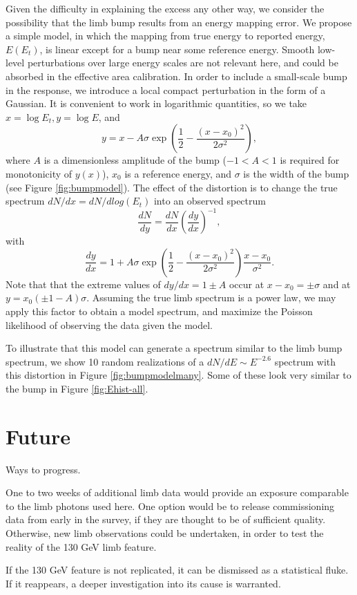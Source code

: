 \documentclass[aps,twocolumn,prd,superscriptaddress,showpacs,nofootinbib,fixfloat]{revtex4}
\newcommand{\be}{\begin{equation}}
\newcommand{\ee}{\end{equation}}
\begin{document}
Given the difficulty in explaining the excess any other way, we consider the
possibility that the limb bump results from an energy mapping error.  We
propose a simple model, in which the mapping from true energy to reported
energy, $E(E_t)$, is linear except for a bump near some reference energy.
Smooth low-level perturbations over large energy scales are not relevant here,
and could be absorbed in the effective area calibration.  In order to include
a small-scale bump in the response, we introduce a local compact perturbation
in the form of a Gaussian.  It is convenient to work in logarithmic
quantities, so we take $x=\log E_t, y=\log E$, and
\be
\label{eq:yofx}
y=x - A\sigma \exp\left(\frac{1}{2}-\frac{(x-x_0)^2}{2\sigma^2}\right),
\ee
where $A$ is a dimensionless amplitude of the bump ($-1<A<1$ is required
for monotonicity of $y(x)$), $x_0$ is a reference energy, and $\sigma$ is the
width of the bump (see Figure \ref{fig:bumpmodel}).
The effect of the distortion is to change the true spectrum $dN/dx =
dN/dlog(E_t)$ into an observed spectrum
\be
\label{eq:dndy}
\frac{dN}{dy} = \frac{dN}{dx} \left(\frac{dy}{dx}\right)^{-1} ,
\ee
with
\be
\label{eq:dydx}
\frac{dy}{dx} = 1 + A\sigma \exp\left(\frac{1}{2}-\frac{(x-x_0)^2}{2\sigma^2}\right)
\frac{x-x_0}{\sigma^2}.
\ee
Note that that the extreme values of $dy/dx = 1 \pm A$ occur at $x-x_0 = \pm
\sigma$ and at $y=x_0(\pm1-A)\sigma$.  Assuming the true limb spectrum is a
power law, we may apply this factor to obtain a model spectrum, and maximize
the Poisson likelihood of observing the data given the model.

To illustrate that this model can generate a spectrum similar to the limb bump
spectrum, we show 10 random realizations of a $dN/dE \sim E^{-2.6}$ spectrum
with this distortion in Figure \ref{fig:bumpmodelmany}.
Some of these look very similar to the bump in Figure \ref{fig:Ehist-all}.


\clearpage
\section{Future}
Ways to progress.

One to two weeks of additional limb data would provide an exposure comparable
to the limb photons used here.  One option would be to release commissioning
data from early in the survey, if they are thought to be of sufficient
quality.  Otherwise, new limb observations could be undertaken, in order to
test the reality of the 130 GeV limb feature.  

If the 130 GeV feature is not replicated, it can be dismissed as a statistical
fluke.  If it reappears, a deeper investigation into its cause is warranted.  
\end{document}
